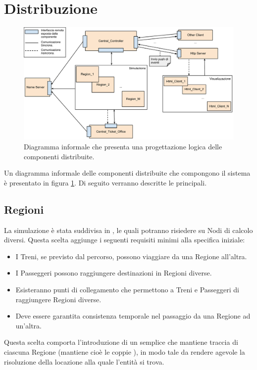 \section{Distribuzione}

	\begin{figure}[htbp]
		\begin{center}
			\includegraphics[scale=0.5,trim= 35mm 0mm 0mm 0mm,keepaspectratio]{imgs/logic_distribution.pdf}
			\caption{\footnotesize{Diagramma informale che presenta una progettazione logica delle componenti distribuite.}}
			\label{fig:logic_distribution}
		\end{center}
	\end{figure}

Un diagramma informale delle componenti distribuite che compongono il sistema è presentato in figura \ref{fig:logic_distribution}. Di seguito verranno descritte le principali.
	
	\subsection{Regioni}\label{sec:distr_regioni}
	
	La simulazione è stata suddivisa in , le quali potranno risiedere su Nodi di calcolo diversi. Questa scelta aggiunge i seguenti requisiti minimi alla specifica iniziale:
	\begin{itemize}
		\item I Treni, se previsto dal percorso, possono viaggiare da una Regione all'altra.
		\item I Passeggeri possono raggiungere destinazioni in Regioni diverse.
		\item Esisteranno punti di collegamento che permettono a Treni e Passeggeri di raggiungere Regioni diverse. 
		\item Deve essere garantita consistenza temporale nel passaggio da una Regione ad un'altra.
	\end{itemize}
	Questa scelta comporta l'introduzione di un semplice  che mantiene traccia di ciascuna Regione (mantiene cioè le coppie ), in modo tale da rendere agevole la risoluzione della locazione alla quale l'entità si trova. 
	
